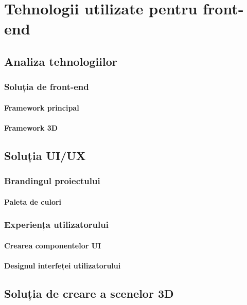 \chapter{Tehnologii utilizate pentru front-end}
\label{chapter:tehnologii}

\section{Analiza tehnologiilor}
\label{sec:proj}
\subsection{Soluția de front-end}
\subsubsection{Framework principal}
\subsubsection{Framework 3D}

\section{Soluția UI/UX}
\label{sub-sec:proj-ui-ux}
\subsection{Brandingul proiectului}
\subsubsection{Paleta de culori}

\subsection{Experiența utilizatorului}
\subsubsection{Crearea componentelor UI}
\subsubsection{Designul interfeței utilizatorului}

\section{Soluția de creare a scenelor 3D}
\label{sec:proj-3d}
